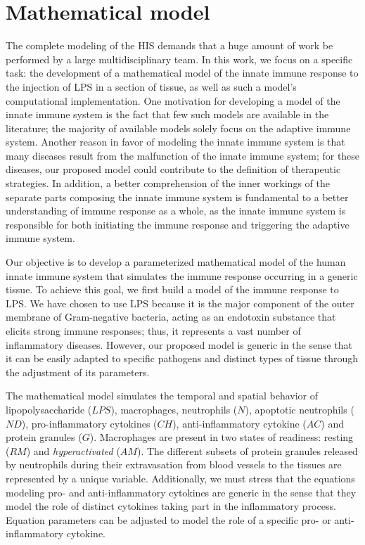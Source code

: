 \documentclass[10pt]{bmc_article}
\newenvironment{bmcformat}{\baselineskip20pt\sloppy\setboolean{publ}{false}}{\baselineskip20pt\sloppy}
\begin{document}
\begin{bmcformat}
\section*{Mathematical model}\label{mathmodel}

The complete modeling of the HIS demands that a huge amount of work be performed by a large multidisciplinary team. In this work, 
we focus on a specific task: the development of a mathematical model of the innate immune response to the injection of LPS in a 
section of tissue, as well as such a model's computational implementation. One motivation for developing a model of the innate 
immune system is the fact that few such models are available in the literature; the majority of available models solely focus on 
the adaptive immune system. Another reason in favor of modeling the innate immune system is that many diseases result from the 
malfunction of the innate immune system; for these diseases, our proposed model could contribute to the definition of therapeutic 
strategies. In addition, a better comprehension of the inner workings of the separate parts composing the innate immune system is 
fundamental to a better understanding of immune response as a whole, as the innate immune system is responsible for both initiating 
the immune response and triggering the adaptive immune system. 

Our objective is to develop a parameterized mathematical model of the human innate immune system that simulates the immune response 
occurring in a generic tissue. To achieve this goal, we first build a model of the immune response to LPS. We have chosen to use
LPS because it is the major component of the outer membrane of Gram-negative bacteria, acting as an endotoxin substance that elicits 
strong immune responses; thus, it represents a vast number of inflammatory diseases. However, our proposed model is generic in the 
sense that it can be easily adapted to specific pathogens and distinct types of tissue through the adjustment of its parameters.

The mathematical model simulates the temporal and spatial behavior of lipopolysaccharide ($LPS$), macrophages, neutrophils ($N$), 
apoptotic neutrophils ($ND$), pro-inflammatory cytokines ($CH$), anti-inflammatory cytokine ($AC$) and protein granules ($G$). 
Macrophages are present in two states of readiness: resting ($RM$) and \textit{hyperactivated} ($AM$). The different subsets of 
protein granules \cite{Niels1997} released by neutrophils during their extravasation from blood vessels to the tissues are represented 
by a unique variable. Additionally, we must stress that the equations modeling pro- and anti-inflammatory cytokines are generic in 
the sense that they model the role of distinct cytokines taking part in the inflammatory process. Equation parameters can be adjusted 
to model the role of a specific pro- or anti-inflammatory cytokine. 


\end{bmcformat}
\end{document}
